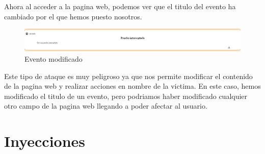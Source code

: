 \documentclass{report}
\begin{document}
                Ahora al acceder a la pagina web, podemos ver que el titulo del evento ha cambiado por el que hemos puesto nosotros.
                \begin{figure}[H]
                    \centering
                    \includegraphics[width=1\textwidth]{./img/vulnerabilidades/2.2/2.5.png}
                    \caption{Evento modificado}
                \end{figure}
                Este tipo de ataque es muy peligroso ya que nos permite modificar el contenido de la pagina web y realizar acciones en nombre de la victima.
                En este caso, hemos modificado el titulo de un evento, pero podriamos haber modificado cualquier otro campo de la pagina web llegando a poder afectar al usuario.
            \clearpage
        \section{Inyecciones}
\end{document}
